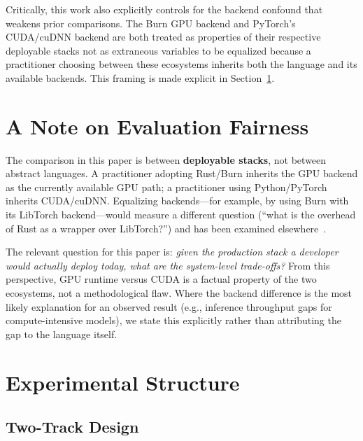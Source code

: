 \documentclass{ieeeaccess}
\begin{document}
Critically, this work also explicitly controls for the backend confound that weakens prior comparisons. The Burn GPU backend and PyTorch's CUDA/cuDNN backend are both treated as properties of their respective deployable stacks not as extraneous variables to be equalized because a practitioner choosing between these ecosystems inherits both the language and its available backends. This framing is made explicit in Section~\ref{sec:fairness}.

\section{A Note on Evaluation Fairness}
\label{sec:fairness}


The comparison in this paper is between \textbf{deployable stacks}, not between abstract languages. A practitioner adopting Rust/Burn inherits the GPU backend as the currently available GPU path; a practitioner using Python/PyTorch inherits CUDA/cuDNN. Equalizing backends---for example, by using Burn with its LibTorch backend---would measure a different question (``what is the overhead of Rust as a wrapper over LibTorch?'') and has been examined elsewhere~\cite{vella2023rust,crespo2023rust}.

The relevant question for this paper is: \emph{given the production stack a developer would actually deploy today, what are the system-level trade-offs?} From this perspective, GPU runtime versus CUDA is a factual property of the two ecosystems, not a methodological flaw. Where the backend difference is the most likely explanation for an observed result (e.g., inference throughput gaps for compute-intensive models), we state this explicitly rather than attributing the gap to the language itself.



\section{Experimental Structure}
\label{sec:structure}

\subsection{Two-Track Design}
\end{document}
